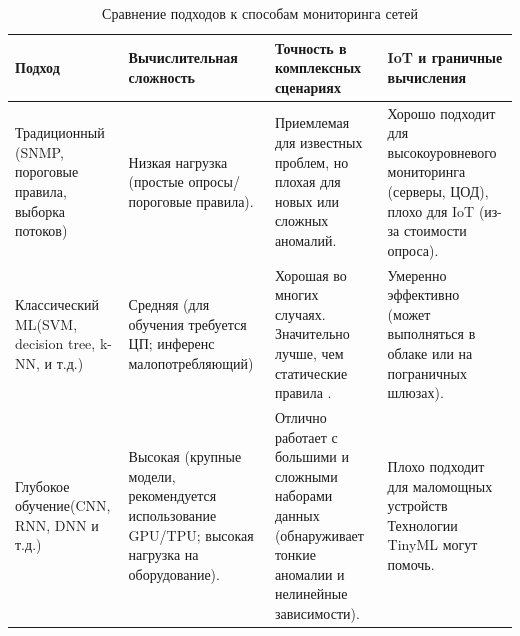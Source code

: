\begin{table}[htbp]
	\centering
	\caption{Сравнение подходов к способам мониторинга сетей}
	\label{tab:methods1}
	\begin{tabular}{|>{\centering\arraybackslash}p{3.5cm}|>{\centering\arraybackslash}p{4.6cm}|>{\centering\arraybackslash}p{3.5cm}|>{\centering\arraybackslash}p{4cm}|}
		\hline
		\textbf{Подход}  & \textbf{Вычислительная сложность} & \textbf{Точность в комплексных сценариях} & \textbf{IoT и граничные вычисления}  \\ \hline
		Традиционный (SNMP, пороговые правила, выборка потоков)  & Низкая нагрузка (простые опросы/ пороговые правила). & Приемлемая для известных проблем, но плохая  для новых или сложных аномалий. & Хорошо подходит для высокоуровневого мониторинга (серверы, ЦОД), плохо для IoT (из-за стоимости опроса). \\ \hline
		Классический ML(SVM, decision tree, k-NN, и т.д.) & Средняя (для обучения требуется ЦП; инференс малопотребляющий) & Хорошая во многих случаях. Значительно лучше, чем статические правила \cite{Mirza2012}.& Умеренно эффективно (может выполняться в облаке или на пограничных шлюзах). \\ \hline 
		Глубокое обучение(CNN, RNN, DNN и т.д.) & Высокая (крупные модели, рекомендуется использование GPU/TPU; высокая нагрузка на оборудование). & Отлично работает с большими и сложными наборами данных \cite{Abbasi2021} (обнаруживает тонкие аномалии и нелинейные зависимости). & Плохо подходит для маломощных устройств Технологии TinyML могут помочь.  \\ \hline
	\end{tabular}
	
\end{table}



\FloatBarrier
